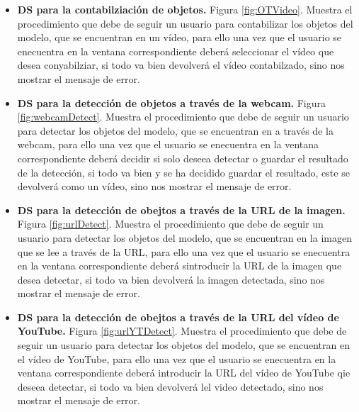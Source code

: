 \begin{itemize}
    \item \textbf{DS para la contabilziación de objetos.} Figura \ref{fig:OTVideo}. Muestra el procedimiento que debe de seguir un usuario para contabilizar los objetos del modelo, que se encuentran en un vídeo, para ello una vez que el usuario se enecuentra en la ventana correspondiente deberá seleccionar el vídeo que desea conyabilziar, si todo va bien devolverá el vídeo contabilzado, sino nos mostrar el mensaje de error.
    \item \textbf{DS para la detección de objetos a través de la webcam.} Figura \ref{fig:webcamDetect}. Muestra el procedimiento que debe de seguir un usuario para detectar los objetos del modelo, que se encuentran en a través de la webcam, para ello una vez que el usuario se enecuentra en la ventana correspondiente deberá decidir si solo deseea detectar o guardar el resultado de la detección, si todo va bien y se ha decidido guardar el resultado, este se devolverá como un vídeo, sino nos mostrar el mensaje de error.
    \item \textbf{DS para la detección de obejtos a través de la URL de la imagen.} Figura \ref{fig:urlDetect}. Muestra el procedimiento que debe de seguir un usuario para detectar los objetos del modelo, que se encuentran en la imagen que se lee a través de la URL, para ello una vez que el usuario se enecuentra en la ventana correspondiente deberá sintroducir la URL de la imagen que desea detectar, si todo va bien devolverá la imagen detectada, sino nos mostrar el mensaje de error.
    \item \textbf{DS para la detección de obejtos a través de la URL del vídeo de YouTube.} Figura \ref{fig:urlYTDetect}. Muestra el procedimiento que debe de seguir un usuario para detectar los objetos del modelo, que se encuentran en el vídeo de YouTube, para ello una vez que el usuario se enecuentra en la ventana correspondiente deberá introducir la URL del vídeo de YouTube qie deseea detectar, si todo va bien devolverá lel video detectado, sino nos mostrar el mensaje de error.
\end{itemize}


